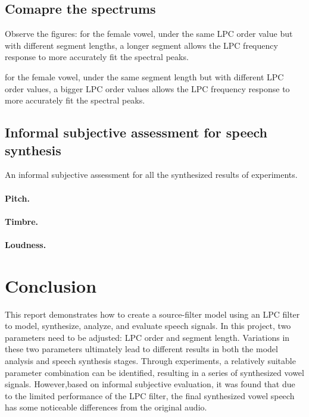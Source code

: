 \documentclass{article}
\begin{document}
\subsection{Comapre the spectrums}

Observe the figures: for the female vowel, under the same LPC order value but with different segment lengths, a longer segment allows the LPC frequency response to more accurately fit the spectral peaks.

for the female vowel, under the same segment length but with different LPC order values, a bigger LPC order values allows the LPC frequency response to more accurately fit the spectral peaks.

\subsection{Informal subjective assessment for speech synthesis}

An informal subjective assessment for all  the synthesized results of experiments.

\paragraph{Pitch.}


\paragraph{Timbre.}

\paragraph{Loudness.}


\section{Conclusion}

This report demonstrates how to create a source-filter model using an LPC filter to model, synthesize, analyze, and evaluate speech signals. In this project, two parameters need to be adjusted: LPC order and segment length. Variations in these two parameters ultimately lead to different results in both the model analysis and speech synthesis stages. Through experiments, a relatively suitable parameter combination can be identified, resulting in a series of synthesized vowel signals. However,based on informal subjective evaluation, it was found  that due to the limited performance of the LPC filter, the final synthesized vowel speech has some noticeable differences from the original audio.


\newcommand{\doi}[1]{DOI: \href{http://dx.doi.org/#1}{\nolinkurl{#1}}}


\end{document}
